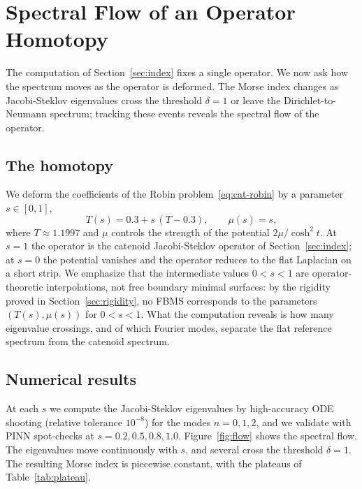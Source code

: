 \documentclass[11pt]{article}
\theoremstyle{definition}
\theoremstyle{plain}
\begin{document}
\section{Spectral Flow of an Operator Homotopy}\label{sec:flow}

The computation of Section~\ref{sec:index} fixes a single operator. We now ask how the spectrum moves as the operator is deformed. The Morse index changes as Jacobi-Steklov eigenvalues cross the threshold $\delta = 1$ or leave the Dirichlet-to-Neumann spectrum; tracking these events reveals the spectral flow of the operator.

\subsection{The homotopy}

We deform the coefficients of the Robin problem~\eqref{eq:cat-robin} by a parameter $s \in [0,1]$,
\begin{equation}\label{eq:homotopy}
	T(s) = 0.3 + s\,(T - 0.3), \qquad \mu(s) = s,
\end{equation}
where $T \approx 1.1997$ and $\mu$ controls the strength of the potential $2\mu/\cosh^2 t$. At $s = 1$ the operator is the catenoid Jacobi-Steklov operator of Section~\ref{sec:index}; at $s = 0$ the potential vanishes and the operator reduces to the flat Laplacian on a short strip. We emphasize that the intermediate values $0 < s < 1$ are operator-theoretic interpolations, not free boundary minimal surfaces: by the rigidity proved in Section~\ref{sec:rigidity}, no FBMS corresponds to the parameters $(T(s), \mu(s))$ for $0 < s < 1$. What the computation reveals is how many eigenvalue crossings, and of which Fourier modes, separate the flat reference spectrum from the catenoid spectrum.

\subsection{Numerical results}

At each $s$ we compute the Jacobi-Steklov eigenvalues by high-accuracy ODE shooting (relative tolerance $10^{-8}$) for the modes $n = 0,1,2$, and we validate with PINN spot-checks at $s = 0.2, 0.5, 0.8, 1.0$. Figure~\ref{fig:flow} shows the spectral flow. The eigenvalues move continuously with $s$, and several cross the threshold $\delta = 1$. The resulting Morse index is piecewise constant, with the plateaus of Table~\ref{tab:plateau}.
\end{document}
